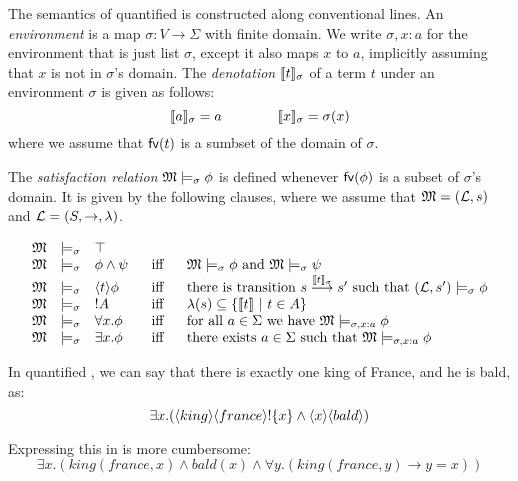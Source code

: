 \begin{definition}
The semantics of quantified \cathoristic{} is constructed along
conventional lines. An \emph{environment} is a map $\sigma : V
\rightarrow \Sigma$ with finite domain.  We write $\sigma, x : a$ for
the environment that is just list $\sigma$, except it also maps $x$ to
$a$, implicitly assuming that $x$ is not in $\sigma$'s domain.  The
\emph{denotation} $\lbrack\!\lbrack t \rbrack\!\rbrack_{\sigma}$ of a term $t$ under an
environment $\sigma$ is given as follows:
\[
   \lbrack\!\lbrack a \rbrack\!\rbrack_{\sigma} = a
      \qquad\qquad
   \lbrack\!\lbrack x \rbrack\!\rbrack_{\sigma} = \sigma(x)
\]
where we assume that $\mathsf{fv}(t)$ is a sumbset of the domain of $\sigma$.

The \emph{satisfaction
  relation} $\frak{M} \models_{\sigma} \phi$ is defined whenever
$\mathsf{fv}(\phi)$ is a subset of $\sigma$'s domain. It is given by the
following clauses, where we assume that $\frak{M} = (\mathcal{L}, s)$ and $\mathcal{L} =
(S, \rightarrow, \lambda)$.

\[
\begin{array}{lclcl}
  \MMM & \models_{\sigma} & \top   \\
  \MMM & \models_{\sigma} & \phi \AND \psi &\ \mbox{ iff } \ & \MMM  \models_{\sigma} \phi \mbox { and } \MMM \models_{\sigma} \psi  \\
  \MMM & \models_{\sigma} & \langle t \rangle \phi & \mbox{ iff } & \text{there is transition } s \TRANS{\SEMB{t}_{\sigma}} s' \mbox { such that } (\LLL, s') \models_{\sigma} \phi  \\
  \MMM & \models_{\sigma} & \fBang A &\mbox{ iff } & \lambda(s) \subseteq \{\SEMB{t}\ |\ t \in A\} \\
  \MMM & \models_{\sigma} & \forall x.\phi &\mbox{ iff } & \text{for all} \ a \in \Sigma\ \text{we have}\ \MMM \models_{\sigma, x : a} \phi \\
  \MMM & \models_{\sigma} & \exists x.\phi &\mbox{ iff } & \text{there exists} \ a \in \Sigma \ \text{such that}\  \MMM \models_{\sigma, x : a} \phi
\end{array}
\]


\end{definition}

\NI In quantified \cathoristic{}, we can say that there is exactly one
king of France, and he is bald, as:
\[
   \exists x . (\langle king \rangle \langle france \rangle ! \{x\} \land \langle x \rangle \langle bald \rangle )
\]

\NI Expressing this in \fol{} is more cumbersome:
\[
   \exists x. ( king(france, x) \land bald(x) \land \forall y. ( king(france, y) \rightarrow y = x ))
\]

